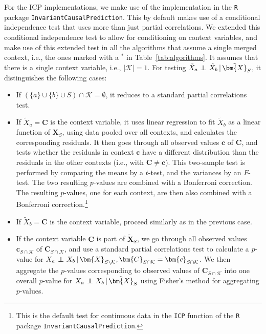 \documentclass[twoside,11pt]{article}
\DeclareMathOperator*{\CI}{{\,\perp\mkern-12mu\perp\,}}
\newcommand\B[1]{\bm{#1}}
\newcommand\C[1]{\mathcal{#1}}
\newcommand\given{\,|\,}
\begin{document}
For the ICP implementations, we make use of the implementation in the \texttt{R} package \texttt{InvariantCausalPrediction}. 
This by default makes use of a conditional independence test that uses more than just partial correlations. We extended this
conditional independence test to allow for conditioning on context variables, and make use of this extended test in all the 
algorithms that assume a single merged context, i.e., the ones
marked with a $^*$ in Table~\ref{tab:algorithms}. It assumes that there is a single context variable, i.e., $|\C{K}| = 1$.
For testing $\tilde{X}_a \CI \tilde{X}_b \given \tilde{\B{X}}_S$, it distinguishes the following cases:
\begin{itemize}
  \item If $(\{a\}\cup\{b\}\cup S) \cap \C{K} = \emptyset$, it reduces to a standard partial correlations test.
  \item If $\tilde{X}_a = \B{C}$ is the context variable, it uses linear regression to fit $\tilde{X}_b$ as a linear function of $\B{X}_S$, using data pooled over all contexts, and calculates the corresponding residuals. It then goes through all observed values $\B{c}$ of $\B{C}$, and tests whether the residuals in context $\B{c}$ have a different distribution than the residuals in the other contexts (i.e., with $\B{C} \ne \B{c}$). This two-sample test is performed by comparing the means by a $t$-test, and the variances by an $F$-test. The
    two resulting $p$-values are combined with a Bonferroni correction. The resulting $p$-values, one for each context, are then also combined with a Bonferroni correction.\footnote{This is the default test  for continuous data in the \texttt{ICP} function of the \texttt{R} package \texttt{InvariantCausalPrediction}.}
  \item If $\tilde{X}_b = \B{C}$ is the context variable, proceed similarly as in the previous case.
  \item If the context variable $\B{C}$ is part of $\tilde{\B{X}}_S$, 
   we go through all observed values $\B{c}_{S \cap \C{K}}$ of $\B{C}_{S \cap \C{K}}$, 
   and use a standard partial correlations test
    to calculate a $p$-value for $X_a \CI X_b \given \B{X}_{S\setminus\C{K}}, \B{C}_{S \cap \C{K}}=\B{c}_{S \cap \C{K}}$. We then aggregate the
    $p$-values corresponding to observed values of $\B{C}_{S \cap \C{K}}$ into one overall $p$-value for $X_a \CI X_b \given \tilde{\B{X}}_S$ using
   Fisher's method for aggregating $p$-values.
\end{itemize}
\end{document}
